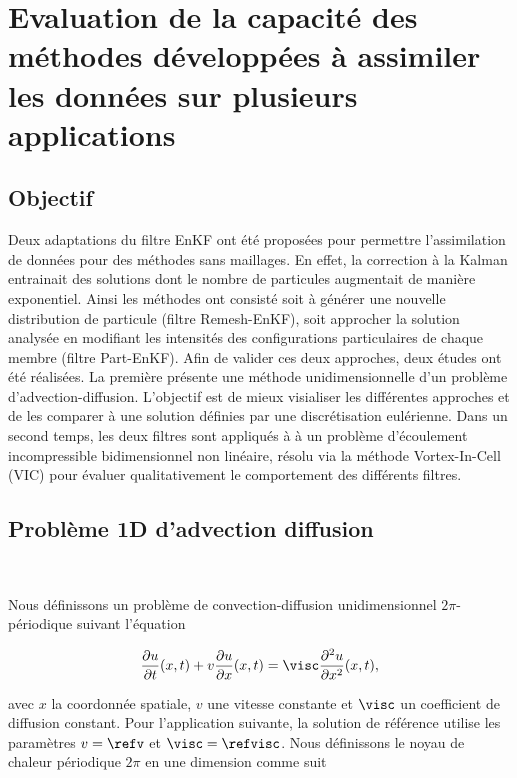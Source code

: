 \chapter{Evaluation de la capacité des méthodes développées à assimiler les données sur plusieurs applications}
\newcommand{\xx}{x_0 = 0.02}
\newcommand{\sigx}{\sigma_0^2 = 0.5}
\section{Objectif}

Deux adaptations du filtre EnKF ont été proposées pour permettre l'assimilation de données pour des méthodes sans maillages. En effet, la correction à la Kalman entrainait des solutions dont le nombre de particules augmentait de manière exponentiel. Ainsi les méthodes ont consisté soit à générer une nouvelle distribution de particule (filtre Remesh-EnKF), soit approcher la solution analysée en modifiant les intensités des configurations particulaires de chaque membre (filtre Part-EnKF). Afin de valider ces deux approches, deux études ont été réalisées. La première présente une méthode unidimensionnelle d'un problème d'advection-diffusion. L'objectif est de mieux visialiser les différentes approches et de les comparer à une solution définies par une discrétisation eulérienne. Dans un second temps, les deux filtres sont appliqués à à un problème d'écoulement incompressible bidimensionnel non linéaire, résolu via la méthode Vortex-In-Cell (VIC) pour évaluer qualitativement le comportement des différents filtres.

\section{Problème 1D d'advection diffusion}~\label{sec:App_1D}

Nous définissons un problème de convection-diffusion unidimensionnel $2\pi$-périodique suivant l'équation

\begin{equation*}
    \frac{\partial u}{\partial t}(x,t) + v \frac{\partial u}{\partial x}(x,t) = \visc \frac{\partial^2 u}{\partial x^2}(x,t),
\end{equation*}

avec $x$ la coordonnée spatiale, $v$ une vitesse constante et $\visc$ un coefficient de diffusion constant.
Pour l'application suivante, la solution de référence utilise les paramètres $v = \refv$ et $\visc = \refvisc$.
Nous définissons le noyau de chaleur périodique $2\pi$ en une dimension comme suit

